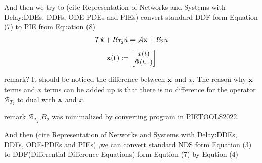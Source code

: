 \documentclass[twocolumn]{autart}    %
\begin{document}
\begin{lem}
    
And then we try to (cite Representation of Networks and Systems with Delay:DDEs, DDFs, ODE-PDEs and PIEs) convert standard DDF form Equation (7) to PIE from Equation (8) 
\begin{equation}
    \begin{aligned}
        \setlength{\arraycolsep}{0.9pt}
        \mathcal{T}\dot{\bold{x}}+\mathcal{B}_{T_{2}}\dot{u} = \mathcal{A}\bold{x}+\mathcal{B}_{2}u
    \end{aligned}
\end{equation}
\begin{equation}
    \begin{aligned}
        \setlength{\arraycolsep}{0.9pt}
        \bold{x(t)} := \begin{bmatrix}
            x(t) \\
            \Phi(t,.)
        \end{bmatrix}\nonumber
    \end{aligned}
\end{equation}
\end{lem}
remark?
It should be noticed the difference between $\bold{x}$ and $x$.
The reason why $\bold{x}$ terms and $x$ terms can be added up is that there is no difference
for the operator $\mathcal{B}_{T_{2}}$ to dual with $\bold{x}$ and $x$.

remark
$\mathcal{B}_{T_{2}}$,$B_{2}$ was minimalized by converting program in PIETOOLS2022.  




And then (cite Representation of Networks and Systems with Delay:DDEs, DDFs, ODE-PDEs and PIEs) ,we can convert standard NDS form Equation (3) to DDF(Differential Difference Equations) form Eqution (7) by Eqution (4)
\end{document}
